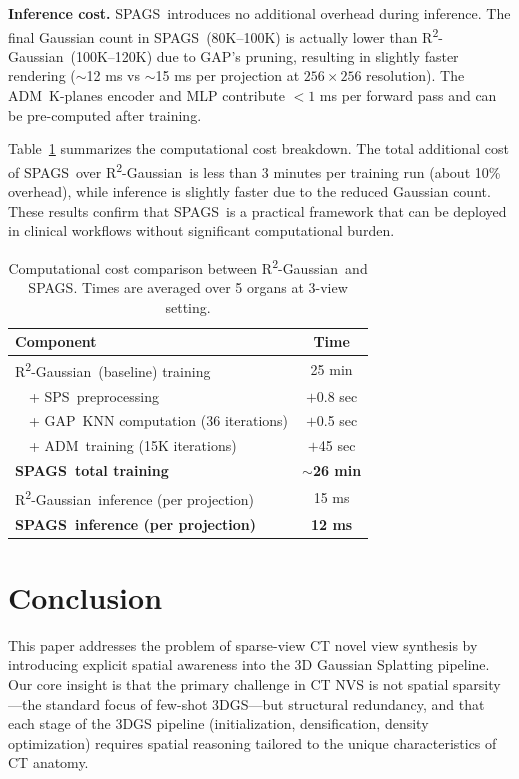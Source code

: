 \documentclass{egPublStyle}
\newcommand{\spags}{SPAGS}
\newcommand{\sps}{SPS}
\newcommand{\gap}{GAP}
\newcommand{\adm}{ADM}
\newcommand{\rtwo}{R\textsuperscript{2}-Gaussian}
\begin{document}
\textbf{Inference cost.} \spags\ introduces no additional overhead during inference. The final Gaussian count in \spags\ (80K--100K) is actually lower than \rtwo\ (100K--120K) due to \gap's pruning, resulting in slightly faster rendering ($\sim$12 ms vs $\sim$15 ms per projection at $256\times256$ resolution). The \adm\ K-planes encoder and MLP contribute $<1$ ms per forward pass and can be pre-computed after training.

Table~\ref{tab:efficiency} summarizes the computational cost breakdown. The total additional cost of \spags\ over \rtwo\ is less than 3 minutes per training run (about 10\% overhead), while inference is slightly faster due to the reduced Gaussian count. These results confirm that \spags\ is a practical framework that can be deployed in clinical workflows without significant computational burden.

\begin{table}[t]
\centering
\caption{Computational cost comparison between \rtwo\ and \spags. Times are averaged over 5 organs at 3-view setting.}
\label{tab:efficiency}
\begin{tabular}{lc}
\toprule
\textbf{Component} & \textbf{Time} \\
\midrule
\rtwo\ (baseline) training & 25 min \\
~~+ \sps\ preprocessing & $+$0.8 sec \\
~~+ \gap\ KNN computation (36 iterations) & $+$0.5 sec \\
~~+ \adm\ training (15K iterations) & $+$45 sec \\
\midrule
\textbf{\spags\ total training} & \textbf{$\sim$26 min} \\
\rtwo\ inference (per projection) & 15 ms \\
\textbf{\spags\ inference (per projection)} & \textbf{12 ms} \\
\bottomrule
\end{tabular}
\end{table}

\section{Conclusion}
\label{sec:conclusion}

This paper addresses the problem of sparse-view CT novel view synthesis by introducing explicit spatial awareness into the 3D Gaussian Splatting pipeline. Our core insight is that the primary challenge in CT NVS is not spatial sparsity---the standard focus of few-shot 3DGS---but structural redundancy, and that each stage of the 3DGS pipeline (initialization, densification, density optimization) requires spatial reasoning tailored to the unique characteristics of CT anatomy.
\end{document}
